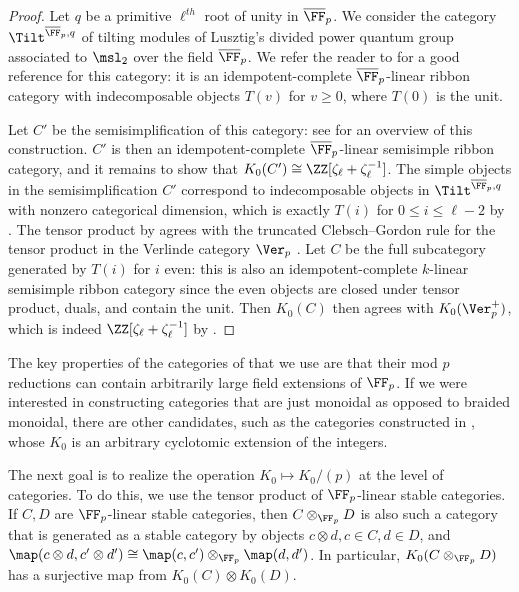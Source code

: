 \documentclass[12pt,oneside]{article}
\begin{document}
\begin{proof}
	Let $q$ be a primitive $\ell^{th}$ root of unity in $\overline{\FF}_p$. We consider the category $\Tilt^{\overline{\FF}_p,q}$ of tilting modules of Lusztig's divided power quantum group associated to $\msl_2$ over the field $\overline{\FF}_p$. We refer the reader to \cite{sl2tiltingmod} for a good reference for this category: it is an idempotent-complete $\overline{\FF}_p$-linear ribbon category with indecomposable objects $T(v)$ for $v\geq 0$, where $T(0)$ is the unit.
	
	Let $C'$ be the semisimplification of this category: see \cite{semisimplification} for an overview of this construction. $C'$ is then an idempotent-complete $\overline{\FF}_p$-linear semisimple ribbon category, and it remains to show that $K_0(C')\cong \ZZ[\zeta_\ell+\zeta_\ell^{-1}]$. The simple objects in the semisimplification $C'$ correspond to indecomposable objects in $\Tilt^{\overline{\FF}_p,q}$ with nonzero categorical dimension, which is exactly $T(i)$ for $0\leq i \leq \ell-2$ by \cite[Proposition 3.23]{sl2tiltingmod}. The tensor product by \cite[Lemma 4.1]{sl2tiltingmod} agrees with the truncated Clebsch--Gordon rule for the tensor product in the Verlinde category $\Ver_p$ \cite[Section 4.2]{etingof2021lectures}. Let $C$ be the full subcategory generated by $T(i)$ for $i$ even: this is also an idempotent-complete $k$-linear semisimple ribbon category since the even objects are closed under tensor product, duals, and contain the unit. Then $K_0(C)$ then agrees with $K_0(\Ver_p^{+})$, which is indeed $\ZZ[\zeta_\ell+\zeta_\ell^{-1}]$ by \cite[Theorem 4.5]{incompressible}.
\end{proof}

\begin{remark}
	The key properties of the categories of  that we use are that their mod $p$ reductions can contain arbitrarily large field extensions of $\FF_p$. If we were interested in constructing categories that are just monoidal as opposed to braided monoidal, there are other candidates, such as the categories constructed in \cite{laugwitz2018categorification}, whose $K_0$ is an arbitrary cyclotomic extension of the integers.
\end{remark}

The next goal is to realize the operation $K_0 \mapsto K_0/(p)$ at the level of categories. To do this, we use the tensor product of $\FF_p$-linear stable categories. If $C,D$ are $\FF_p$-linear stable categories, then $C\otimes_{\FF_p}D$ is also such a category that is generated as a stable category by objects $c\otimes d, c \in C, d \in D$, and $\map(c\otimes d,c'\otimes d') \cong \map(c,c')\otimes_{\FF_p}\map(d,d')$. In particular, $K_0(C\otimes_{\FF_p}D)$ has a surjective map from $K_0(C)\otimes K_0(D)$.
\end{document}
